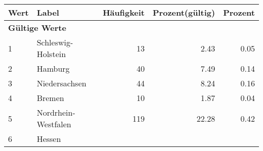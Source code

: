      \begin{longtable}{lXrrr}
     \toprule
     \textbf{Wert} & \textbf{Label} & \textbf{Häufigkeit} & \textbf{Prozent(gültig)} & \textbf{Prozent} \\
     \endhead
     \midrule
     \multicolumn{5}{l}{\textbf{Gültige Werte}}\\

     1 &
     \multicolumn{1}{X}{ Schleswig-Holstein   } &


       \num{13} &
       \num[round-mode=places,round-precision=2]{2,43} &
         \num[round-mode=places,round-precision=2]{0,05} \\

     2 &
     \multicolumn{1}{X}{ Hamburg   } &


       \num{40} &
       \num[round-mode=places,round-precision=2]{7,49} &
         \num[round-mode=places,round-precision=2]{0,14} \\

     3 &
     \multicolumn{1}{X}{ Niedersachsen   } &


       \num{44} &
       \num[round-mode=places,round-precision=2]{8,24} &
         \num[round-mode=places,round-precision=2]{0,16} \\

     4 &
     \multicolumn{1}{X}{ Bremen   } &


       \num{10} &
       \num[round-mode=places,round-precision=2]{1,87} &
         \num[round-mode=places,round-precision=2]{0,04} \\

     5 &
     \multicolumn{1}{X}{ Nordrhein-Westfalen   } &


       \num{119} &
       \num[round-mode=places,round-precision=2]{22,28} &
         \num[round-mode=places,round-precision=2]{0,42} \\

     6 &
     \multicolumn{1}{X}{ Hessen   } &



\end{longtable}
